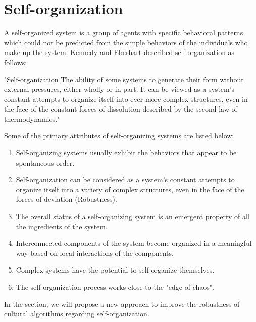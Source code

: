 \section{Self-organization}
A self-organized system is a group of agents with specific behavioral patterns which could not be predicted from the simple behaviors of the  individuals who make up the system. Kennedy and Eberhart \cite{kennedy2001swarm} described self-organization as follows: 
\begin{displayquote}
	"Self-organization The ability of some systems to generate their form without external pressures, either wholly or in part. It can be viewed as a system's constant attempts to organize itself into ever more complex structures, even in the face of the constant forces of dissolution described by the second law of thermodynamics."
\end{displayquote}
Some of the primary attributes of self-organizing systems are listed below:
\begin{enumerate}
	\item Self-organizing systems usually exhibit the behaviors that appear to be spontaneous order.
	\item Self-organization can be considered as a system's constant attempts to organize itself into a variety of complex structures, even in the face of the forces of deviation (Robustness).
	\item The overall status of a self-organizing system is an emergent property of all the ingredients of the system.
	\item Interconnected components of the system become organized in a meaningful way based on local interactions of the components.
	\item Complex systems have the potential to self-organize themselves.
	\item The self-organization process works close to the "edge of chaos".
\end{enumerate}
In the section, we will propose a new approach to improve the robustness of cultural algorithms regarding self-organization.
